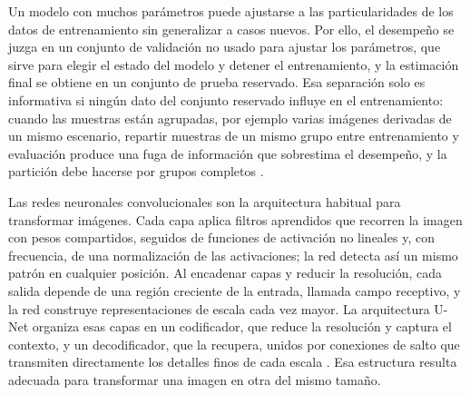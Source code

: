 Un modelo con muchos parámetros puede ajustarse a las particularidades de los datos de entrenamiento sin generalizar a casos nuevos. Por ello, el desempeño se juzga en un conjunto de validación no usado para ajustar los parámetros, que sirve para elegir el estado del modelo y detener el entrenamiento, y la estimación final se obtiene en un conjunto de prueba reservado. Esa separación solo es informativa si ningún dato del conjunto reservado influye en el entrenamiento: cuando las muestras están agrupadas, por ejemplo varias imágenes derivadas de un mismo escenario, repartir muestras de un mismo grupo entre entrenamiento y evaluación produce una fuga de información que sobrestima el desempeño, y la partición debe hacerse por grupos completos \parencite{kaufman2012}.

Las redes neuronales convolucionales son la arquitectura habitual para transformar imágenes. Cada capa aplica filtros aprendidos que recorren la imagen con pesos compartidos, seguidos de funciones de activación no lineales y, con frecuencia, de una normalización de las activaciones; la red detecta así un mismo patrón en cualquier posición. Al encadenar capas y reducir la resolución, cada salida depende de una región creciente de la entrada, llamada campo receptivo, y la red construye representaciones de escala cada vez mayor. La arquitectura U-Net organiza esas capas en un codificador, que reduce la resolución y captura el contexto, y un decodificador, que la recupera, unidos por conexiones de salto que transmiten directamente los detalles finos de cada escala \parencite{ronneberger2015}. Esa estructura resulta adecuada para transformar una imagen en otra del mismo tamaño.

